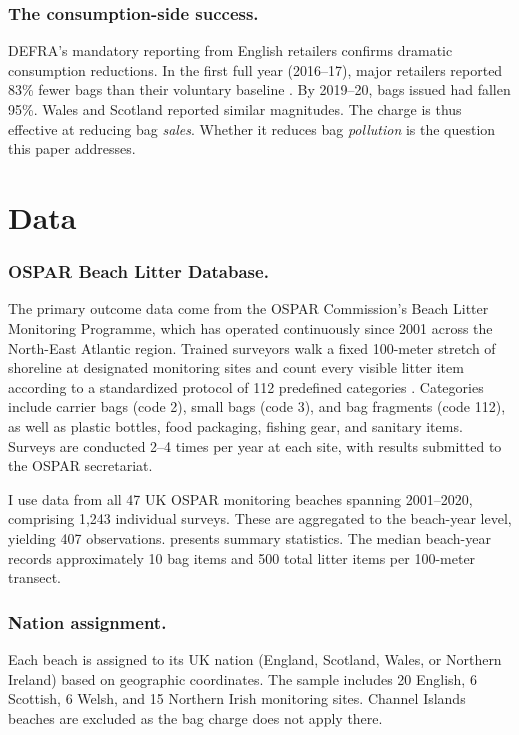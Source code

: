 \documentclass[12pt]{article}
\begin{document}
\subsubsection*{The consumption-side success.} DEFRA's mandatory reporting from English retailers confirms dramatic consumption reductions. In the first full year (2016--17), major retailers reported 83\% fewer bags than their voluntary baseline \citep{defra_carrier_2020}. By 2019--20, bags issued had fallen 95\%. Wales and Scotland reported similar magnitudes. The charge is thus effective at reducing bag \textit{sales}. Whether it reduces bag \textit{pollution} is the question this paper addresses.

\section{Data}

\subsubsection*{OSPAR Beach Litter Database.} The primary outcome data come from the OSPAR Commission's Beach Litter Monitoring Programme, which has operated continuously since 2001 across the North-East Atlantic region. Trained surveyors walk a fixed 100-meter stretch of shoreline at designated monitoring sites and count every visible litter item according to a standardized protocol of 112 predefined categories \citep{ospar_commission_guideline_2010}. Categories include carrier bags (code 2), small bags (code 3), and bag fragments (code 112), as well as plastic bottles, food packaging, fishing gear, and sanitary items. Surveys are conducted 2--4 times per year at each site, with results submitted to the OSPAR secretariat.

I use data from all 47 UK OSPAR monitoring beaches spanning 2001--2020, comprising 1,243 individual surveys. These are aggregated to the beach-year level, yielding 407 observations.  presents summary statistics. The median beach-year records approximately 10 bag items and 500 total litter items per 100-meter transect.

\subsubsection*{Nation assignment.} Each beach is assigned to its UK nation (England, Scotland, Wales, or Northern Ireland) based on geographic coordinates. The sample includes 20 English, 6 Scottish, 6 Welsh, and 15 Northern Irish monitoring sites. Channel Islands beaches are excluded as the bag charge does not apply there.
\end{document}
